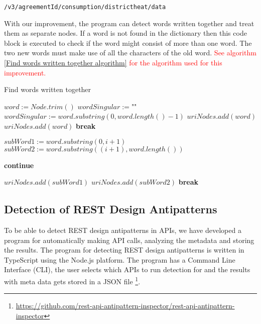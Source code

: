 \vspace{2mm}
\texttt{/v3/{agreementId}/consumption/districtheat/data}

\vspace{2mm}
With our improvement, the program can detect words written together and treat them as separate nodes. If a word is not found in the dictionary then this code block is executed to check if the word might consist of more than one word. The two new words must make use of all the characters of the old word. \textcolor{red}{See algorithm \ref{Find words written together algorithm} for the algorithm used for this improvement.}

\begin{algorithm}
\caption{Find words written together}
\begin{algorithmic}
\State $word := Node.trim()$
\State $wordSingular := $""$ $
    \State $wordSingular := word.substring(0, word.length() - 1)$
\EndIf
{}
    \State $uriNodes.add(word)$
\Else
{}
        \State $uriNodes.add(word)$
        \State \textbf{break}
    \EndIf
    
    \State $subWord1 := word.substring(0, i + 1)$
    \State $subWord2 := word.substring((i + 1), word.length())$
    
        \State \textbf{continue}
    \EndIf
    
        \State $uriNodes.add(subWord1)$
        \State $uriNodes.add(subWord2)$
        \State \textbf{break}
    \EndIf
\EndFor
\EndIf
\end{algorithmic}
\label{Find words written together algorithm}
\end{algorithm}

\clearpage

\subsection{Detection of REST Design Antipatterns}

To be able to detect REST design antipatterns in APIs, we have developed a program for automatically making API calls, analyzing the metadata and storing the results. 
The program for detecting REST design antipatterns is written in TypeScript using the Node.js platform. The program has a Command Line Interface (CLI), the user selects which APIs to run detection for and the results with meta data gets stored in a JSON file \footnote{\url{https://github.com/rest-api-antipattern-inspector/rest-api-antipattern-inspector}}. 

